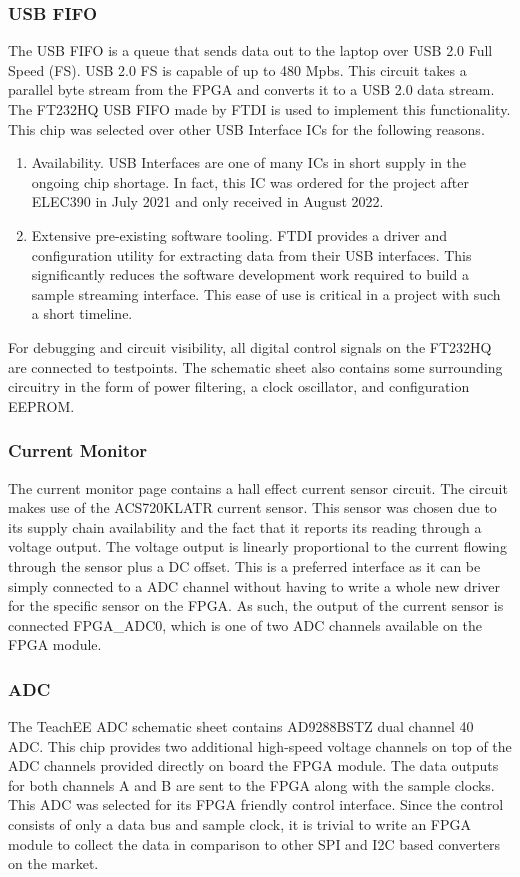\documentclass[letterpaper,11pt]{article}
\begin{document}
\subsubsection{USB FIFO}
The USB FIFO is a queue that sends data out to the laptop over USB 2.0 Full
Speed (FS). USB 2.0 FS is capable of up to 480 Mpbs. This circuit takes a
parallel byte stream from the FPGA and converts it to a USB 2.0 data stream. The
FT232HQ USB FIFO made by FTDI is used to implement this functionality. This chip
was selected over other USB Interface ICs for the following reasons.
  \begin{enumerate}
    \item Availability. USB Interfaces are one of many ICs in short supply
      in the ongoing chip shortage. In fact, this IC was ordered for the
      project after ELEC390 in July 2021 and only received in August 2022.
    \item Extensive pre-existing software tooling. FTDI provides a driver and
      configuration utility for extracting data from their USB interfaces. This
      significantly reduces the software development work required to build a
      sample streaming interface. This ease of use is critical in a project with
      such a short timeline.
  \end{enumerate}

For debugging and circuit visibility, all digital control signals on the
FT232HQ are connected to testpoints. The schematic sheet also contains some
surrounding circuitry in the form of power filtering, a clock oscillator, and
configuration EEPROM.

\subsubsection{Current Monitor}
The current monitor page contains a hall effect current sensor circuit. The
circuit makes use of the ACS720KLATR current sensor. This sensor was chosen due
to its supply chain availability and the fact that it reports its reading
through a voltage output. The voltage output is linearly proportional to the
current flowing through the sensor plus a DC offset. This is a preferred
interface as it can be simply connected to a ADC channel without having to write
a whole new driver for the specific sensor on the FPGA. As such, the output of
the current sensor is connected FPGA\_ADC0, which is one of two ADC channels
available on the FPGA module.

\subsubsection{ADC}
The TeachEE ADC schematic sheet contains AD9288BSTZ dual channel
\SI{40}{\mega\samplepersec} ADC. This chip provides two additional high-speed
voltage channels on top of the ADC channels provided directly on board the FPGA
module. The data outputs for both channels A and B are sent to the FPGA along
with the sample clocks. This ADC was selected for its FPGA friendly control
interface. Since the control consists of only a data bus and sample clock, it is
trivial to write an FPGA module to collect the data in comparison to other SPI
and I2C based converters on the market.
\end{document}
